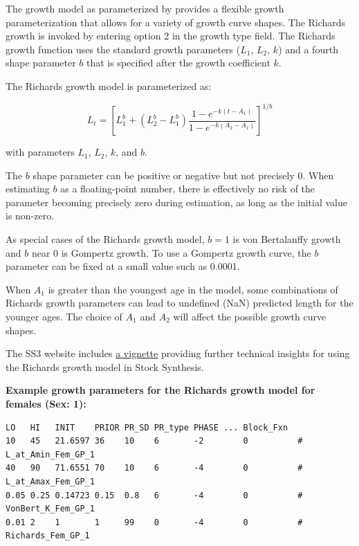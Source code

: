 \hypertarget{Richards}{}
The \citet{richards1959growth} growth model as parameterized by \citet{schnute1981growth} provides a flexible growth parameterization that allows for a variety of growth curve shapes. The Richards growth is invoked by entering option 2 in the growth type field. The Richards growth function uses the standard growth parameters ($L_1$, $L_2$, $k$) and a fourth shape parameter $b$ that is specified after the growth coefficient $k$.

The Richards growth model is parameterized as:

\begin{equation}
	L_t = \left[L_1^b + (L_2^b-L_1^b)\frac{1-e^{-k(t-A_{1})}}{1-e^{-k(A_2-A_1)}}\right]^{1/b}
\end{equation}

with parameters $L_1$, $L_2$, $k$, and $b$.

The $b$ shape parameter can be positive or negative but not precisely 0. When estimating $b$ as a floating-point number, there is effectively no risk of the parameter becoming precisely zero during estimation, as long as the initial value is non-zero.

As special cases of the Richards growth model, $b\!=\!1$ is von Bertalanffy growth and $b$ near 0 is Gompertz growth. To use a Gompertz growth curve, the $b$ parameter can be fixed at a small value such as 0.0001.

When $A_1$ is greater than the youngest age in the model, some combinations of Richards growth parameters can lead to undefined (NaN) predicted length for the younger ages. The choice of $A_1$ and $A_2$ will affect the possible growth curve shapes.

The SS3 website includes \href{https://nmfs-ost.github.io/ss3-website/qmds/richards_growth_curve.html}{a vignette} providing further technical insights for using the Richards growth model in Stock Synthesis.

\textbf{Example growth parameters for the Richards growth model for females (Sex: 1):}

\begin{verbatim}
LO   HI   INIT    PRIOR PR_SD PR_type PHASE ... Block_Fxn 
10   45   21.6597 36    10    6       -2        0          # L_at_Amin_Fem_GP_1
40   90   71.6551 70    10    6       -4        0          # L_at_Amax_Fem_GP_1
0.05 0.25 0.14723 0.15  0.8   6       -4        0          # VonBert_K_Fem_GP_1
0.01 2    1       1     99    0       -4        0          # Richards_Fem_GP_1
\end{verbatim}


